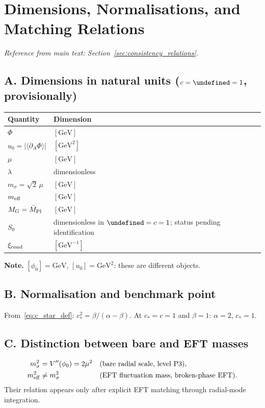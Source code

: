 \documentclass[11pt,a4paper]{article}
\let\hbar\undefined
\numberwithin{equation}{section}
\begin{document}
\section{Dimensions, Normalisations, and Matching Relations}
\label{app:dimensions}

\textit{Reference from main text: Section~\ref{sec:consistency_relations}.}

\subsection*{A. Dimensions in natural units ($c=\hbar=1$, provisionally)}

\begin{center}
\renewcommand{\arraystretch}{1.3}
\begin{tabular}{ll}
\hline
Quantity & Dimension \\
\hline
$\Phi$ & $[\text{GeV}]$ \\
$u_0=|\langle\partial_A\Phi\rangle|$ & $[\text{GeV}^2]$ \\
$\mu$ & $[\text{GeV}]$ \\
$\lambda$ & dimensionless \\
$m_\sigma=\sqrt{2}\,\mu$ & $[\text{GeV}]$ \\
$m_{\rm eff}$ & $[\text{GeV}]$ \\
$M_G=\bar{M}_{\rm Pl}$ & $[\text{GeV}]$ \\
$S_0$ & dimensionless in $\hbar=c=1$; status pending identification \\
$\xi_{\rm cond}$ & $[\text{GeV}^{-1}]$ \\
\hline
\end{tabular}
\end{center}

\noindent\textbf{Note.} $[\phi_0]=\text{GeV}$, $[u_0]=\text{GeV}^2$: these are different objects.

\subsection*{B. Normalisation and benchmark point}

From~\eqref{eq:c_star_def}: $c_*^2=\beta/(\alpha-\beta)$.
At $c_*=c=1$ and $\beta=1$: $\alpha=2$, $c_*=1$.

\subsection*{C. Distinction between bare and EFT masses}

\begin{align}
  m_\sigma^2 &= V''(\phi_0)=2\mu^2
  &&\text{(bare radial scale, level P3)},\\
  m_{\rm eff}^2 &\neq m_\sigma^2
  &&\text{(EFT fluctuation mass, broken-phase EFT)}.
\end{align}
Their relation appears only after explicit EFT matching through radial-mode integration.
\end{document}

